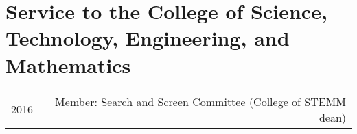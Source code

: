 \section*{Service to the College of Science, Technology, Engineering, and Mathematics}
\begin{tabular}{L!{\VRule}R}
2016&Member: Search and Screen Committee (College of STEMM dean)\\
\end{tabular}